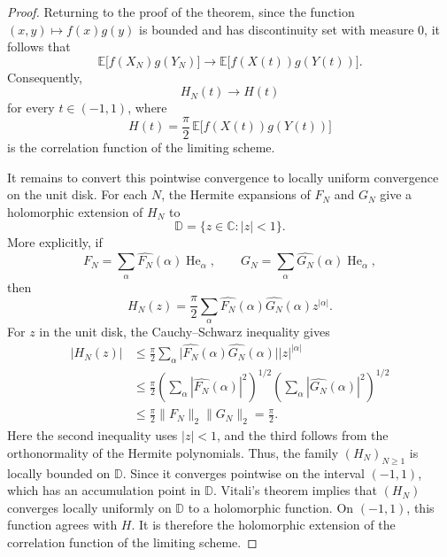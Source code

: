 \begin{proof}
Returning to the proof of the theorem, since the function
\(
(x,y)\longmapsto f(x)g(y)
\)
 is bounded and has discontinuity set with measure 0, it follows that
\[
\mathbb{E}\bigl[f(X_N)g(Y_N)\bigr]
\longrightarrow
\mathbb{E}\bigl[f(X(t))g(Y(t))\bigr].
\]
Consequently,
\[
H_N(t)\longrightarrow H(t)
\]
for every \(t\in(-1,1)\), where
\[
H(t)
=
\frac{\pi}{2}\,
\mathbb{E}\bigl[f(X(t))g(Y(t))\bigr]
\]
is the correlation function of the limiting scheme.

It remains to convert this pointwise convergence to locally uniform
convergence on the unit disk. For each \(N\), the Hermite expansions of
\(F_N\) and \(G_N\) give a holomorphic extension of \(H_N\) to
\[
\mathbb{D}
=
\{z\in\mathbb{C}:|z|<1\}.
\]
More explicitly, if
\[
F_N=\sum_{\alpha}\widehat{F_N}(\alpha)\operatorname{He}_{\alpha},
\qquad
G_N=\sum_{\alpha}\widehat{G_N}(\alpha)\operatorname{He}_{\alpha},
\]
then
\[
H_N(z)
=
\frac{\pi}{2}
\sum_{\alpha}
\widehat{F_N}(\alpha)\widehat{G_N}(\alpha)z^{|\alpha|}.
\]
For \(z\) in the unit disk, the Cauchy--Schwarz inequality gives
\[
\begin{aligned}
|H_N(z)|
&\leq
\frac{\pi}{2}
\sum_{\alpha}
\bigl|
\widehat{F_N}(\alpha)\widehat{G_N}(\alpha)
\bigr|
|z|^{|\alpha|} \\
&\leq
\frac{\pi}{2}
\left(
\sum_{\alpha}
|\widehat{F_N}(\alpha)|^2
\right)^{1/2}
\left(
\sum_{\alpha}
|\widehat{G_N}(\alpha)|^2
\right)^{1/2} \\
&\leq
\frac{\pi}{2}
\|F_N\|_2\|G_N\|_2
=
\frac{\pi}{2}.
\end{aligned}
\]
Here the second inequality uses \(|z|<1\), and the third follows from
the orthonormality of the Hermite polynomials.
Thus, the family \((H_N)_{N\geq 1}\) is locally bounded on \(\mathbb{D}\).
Since it converges pointwise on the interval \((-1,1)\), which has an
accumulation point in \(\mathbb{D}\). Vitali's theorem implies that
\((H_N)\) converges locally uniformly on \(\mathbb{D}\) to a holomorphic
function. On \((-1,1)\), this function agrees with \(H\). It is therefore
the holomorphic extension of the correlation function of the limiting
scheme.
\end{proof}

